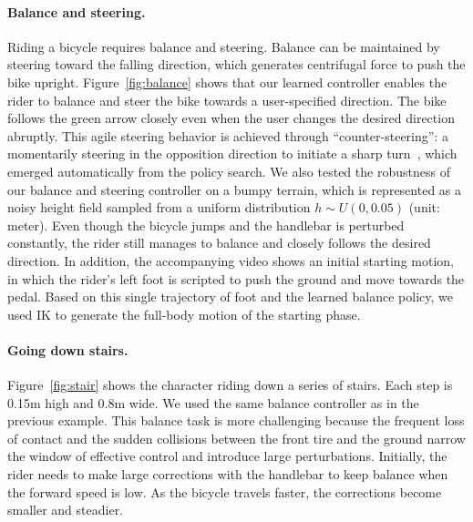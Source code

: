 \paragraph{Balance and steering.} Riding a bicycle requires balance and steering. Balance can be maintained by steering toward the falling direction, which generates centrifugal force to push the bike upright. Figure~\ref{fig:balance} shows that our learned controller enables the rider to balance and steer the bike towards a user-specified direction. The bike follows the green arrow closely even when the user changes the desired direction abruptly. This agile steering behavior is achieved through ``counter-steering'': a momentarily steering in the opposition direction to initiate a sharp turn~\cite{Rankine1870}, which emerged automatically from the policy search. We also tested the robustness of our balance and steering controller on a bumpy terrain, which is represented as a noisy height field sampled from a uniform distribution $h\sim U(0, 0.05)$ (unit: meter). Even though the bicycle jumps and the handlebar is perturbed constantly, the rider still manages to balance and closely follows the desired direction. In addition, the accompanying video shows an initial starting motion, in which the rider's left foot is scripted to push the ground and move towards the pedal. Based on this single trajectory of foot and the learned balance policy, we used IK to generate the full-body motion of the starting phase.

\paragraph{Going down stairs.} Figure~\ref{fig:stair} shows the character riding down a series of stairs. Each step is 0.15m high and 0.8m wide. We used the same balance controller as in the previous example. This balance task is more challenging because the frequent loss of contact and the sudden collisions between the front tire and the ground narrow the window of effective control and introduce large perturbations. Initially, the rider needs to make large corrections with the handlebar to keep balance when the forward speed is low. As the bicycle travels faster, the corrections become smaller and steadier.


